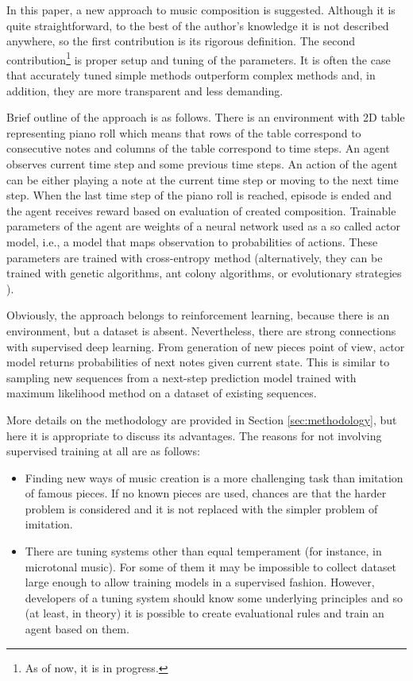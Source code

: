 \documentclass{article}
\begin{document}
In this paper, a new approach to music composition is suggested. Although it is quite straightforward, to the best of the author's knowledge it is not described anywhere, so the first contribution is its rigorous definition. The second contribution\footnote{As of now, it is in progress.} is proper setup and tuning of the parameters. It is often the case that accurately tuned simple methods outperform complex methods \cite{dacrema2019are} and, in addition, they are more transparent and less demanding.

Brief outline of the approach is as follows. There is an environment with 2D table representing piano roll which means that rows of the table correspond to consecutive notes and columns of the table correspond to time steps. An agent observes current time step and some previous time steps. An action of the agent can be either playing a note at the current time step or moving to the next time step. When the last time step of the piano roll is reached, episode is ended and the agent receives reward based on evaluation of created composition. Trainable parameters of the agent are weights of a neural network used as a so called actor model, i.e., a model that maps observation to probabilities of actions. These parameters are trained with cross-entropy method \cite{rubinstein1997optimization} (alternatively, they can be trained with genetic algorithms, ant colony algorithms, or evolutionary strategies \cite{salimans2017evolution}).

Obviously, the approach belongs to reinforcement learning, because there is an environment, but a dataset is absent. Nevertheless, there are strong connections with supervised deep learning. From generation of new pieces point of view, actor model returns probabilities of next notes given current state. This is similar to sampling new sequences from a next-step prediction model trained with maximum likelihood method on a dataset of existing sequences.

More details on the methodology are provided in Section \ref{sec:methodology}, but here it is appropriate to discuss its advantages. The reasons for not involving supervised training at all are as follows:
\begin{itemize}
	\item Finding new ways of music creation is a more challenging task than imitation of famous pieces. If no known pieces are used, chances are that the harder problem is considered and it is not replaced with the simpler problem of imitation.
	\item There are tuning systems other than equal temperament (for instance, in microtonal music). For some of them it may be impossible to collect dataset large enough to allow training models in a supervised fashion. However, developers of a tuning system should know some underlying principles and so (at least, in theory) it is possible to create evaluational rules and train an agent based on them.
\end{itemize}
\end{document}

